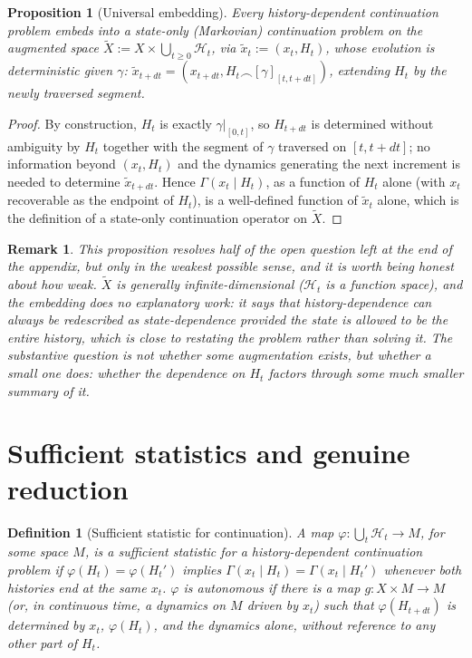 \documentclass[11pt]{report}
\newtheorem{proposition}{Proposition}[chapter]
\newtheorem{definition}{Definition}[chapter]
\newtheorem{remark}{Remark}[chapter]
\begin{document}
\begin{proposition}[Universal embedding]
Every history-dependent continuation problem embeds into a state-only
(Markovian) continuation problem on the augmented space
$\tilde X := X \times \bigcup_{t \geq 0} \mathcal{H}_t$, via
$\tilde x_t := (x_t, H_t)$, whose evolution is deterministic given
$\gamma$: $\tilde x_{t+dt} = (x_{t+dt}, H_t \frown [\gamma]_{[t,t+dt]})$,
extending $H_t$ by the newly traversed segment.
\end{proposition}
\begin{proof}
By construction, $H_t$ is exactly $\gamma|_{[0,t]}$, so $H_{t+dt}$ is
determined without ambiguity by $H_t$ together with the segment of
$\gamma$ traversed on $[t, t+dt]$; no information beyond
$(x_t, H_t)$ and the dynamics generating the next increment is needed
to determine $\tilde x_{t+dt}$. Hence $\Gamma(x_t \mid H_t)$, as a
function of $H_t$ alone (with $x_t$ recoverable as the endpoint of
$H_t$), is a well-defined function of $\tilde x_t$ alone, which is the
definition of a state-only continuation operator on $\tilde X$.
\end{proof}

\begin{remark}
This proposition resolves half of the open question left at the end of
the appendix, but only in the weakest possible sense, and it is worth
being honest about how weak. $\tilde X$ is generally
infinite-dimensional ($\mathcal{H}_t$ is a function space), and the
embedding does no explanatory work: it says that history-dependence can
always be redescribed as state-dependence provided the state is allowed
to be the entire history, which is close to restating the problem
rather than solving it. The substantive question is not whether some
augmentation exists, but whether a \emph{small} one does: whether the
dependence on $H_t$ factors through some much smaller summary of it.
\end{remark}

\section*{Sufficient statistics and genuine reduction}

\begin{definition}[Sufficient statistic for continuation]
A map $\varphi : \bigcup_t \mathcal{H}_t \to M$, for some space $M$, is
a sufficient statistic for a history-dependent continuation problem if
$\varphi(H_t) = \varphi(H_t')$ implies
$\Gamma(x_t \mid H_t) = \Gamma(x_t \mid H_t')$ whenever both histories
end at the same $x_t$. $\varphi$ is autonomous if there is a map
$g : X \times M \to M$ (or, in continuous time, a dynamics on $M$
driven by $x_t$) such that $\varphi(H_{t+dt})$ is determined by
$x_t$, $\varphi(H_t)$, and the dynamics alone, without reference to any
other part of $H_t$.
\end{definition}
\end{document}
